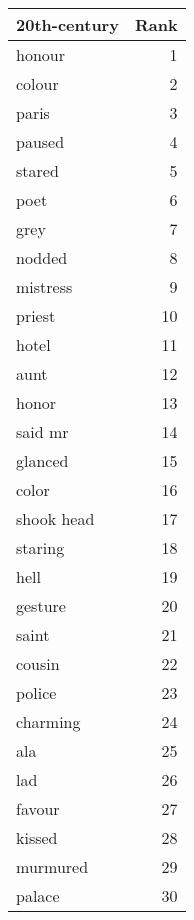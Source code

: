 \begin{table}
\label{tab:20th-century_terms}
\begin{tabular}{lr}
\toprule
20th-century & Rank \\
\midrule
honour & 1 \\
colour & 2 \\
paris & 3 \\
paused & 4 \\
stared & 5 \\
poet & 6 \\
grey & 7 \\
nodded & 8 \\
mistress & 9 \\
priest & 10 \\
hotel & 11 \\
aunt & 12 \\
honor & 13 \\
said mr & 14 \\
glanced & 15 \\
color & 16 \\
shook head & 17 \\
staring & 18 \\
hell & 19 \\
gesture & 20 \\
saint & 21 \\
cousin & 22 \\
police & 23 \\
charming & 24 \\
ala & 25 \\
lad & 26 \\
favour & 27 \\
kissed & 28 \\
murmured & 29 \\
palace & 30 \\
\bottomrule
\end{tabular}
\end{table}
